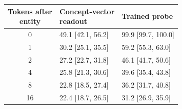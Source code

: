 \begin{tabular}{@{}cll@{}}
\toprule
\shortstack[l]{Tokens after\\entity} & \shortstack[l]{Concept-vector\\readout} & Trained probe \\
\midrule
0 & 49.1 {\scriptsize[42.1, 56.2]} & 99.9 {\scriptsize[99.7, 100.0]} \\
1 & 30.2 {\scriptsize[25.1, 35.5]} & 59.2 {\scriptsize[55.3, 63.0]} \\
2 & 27.2 {\scriptsize[22.7, 31.8]} & 46.1 {\scriptsize[41.7, 50.6]} \\
4 & 25.8 {\scriptsize[21.3, 30.6]} & 39.6 {\scriptsize[35.4, 43.8]} \\
8 & 22.8 {\scriptsize[18.5, 27.4]} & 36.2 {\scriptsize[31.7, 40.8]} \\
16 & 22.4 {\scriptsize[18.7, 26.5]} & 31.2 {\scriptsize[26.9, 35.9]} \\
\bottomrule
\end{tabular}
